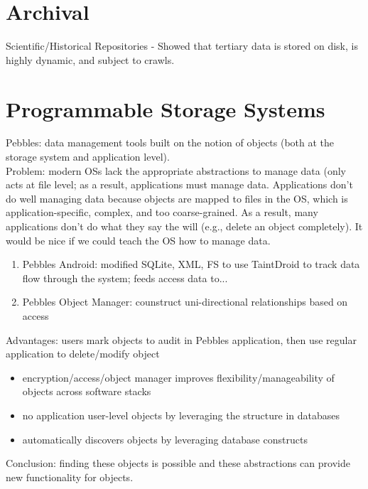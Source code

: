 \documentclass{article}
\begin{document}
\section{Archival}
\noindent\cite{adams:techreport2012-archival} Scientific/Historical Repositories - Showed that tertiary data is stored on disk, is highly dynamic, and subject to crawls.

\section{Programmable Storage Systems}

\noindent\cite{spahn:osdi2014-pebbles} Pebbles: data management tools built on the notion of objects (both at the storage system and application level). \\
Problem: modern OSs lack the appropriate abstractions to manage data (only acts at file level; as a result, applications must manage data. Applications don't do well managing data because objects are mapped to files in the OS, which is application-specific, complex, and too coarse-grained. As a result, many applications don't do what they say the will (e.g., delete an object completely). It would be nice if we could teach the OS how to manage data.
\begin{enumerate}
	\item Pebbles Android: modified SQLite, XML, FS to use TaintDroid to track data flow through the system; feeds access data to...
	\item Pebbles Object Manager: counstruct uni-directional relationships based on access
\end{enumerate}
Advantages: users mark objects to audit in Pebbles application, then use regular application to delete/modify object
\begin{itemize}
	\item encryption/access/object manager improves flexibility/manageability of objects across software stacks
	\item no application user-level objects by leveraging the structure in databases
	\item automatically discovers objects by leveraging database constructs
\end{itemize}
Conclusion: finding these objects is possible and these abstractions can provide new functionality for objects.\\
\end{document}
